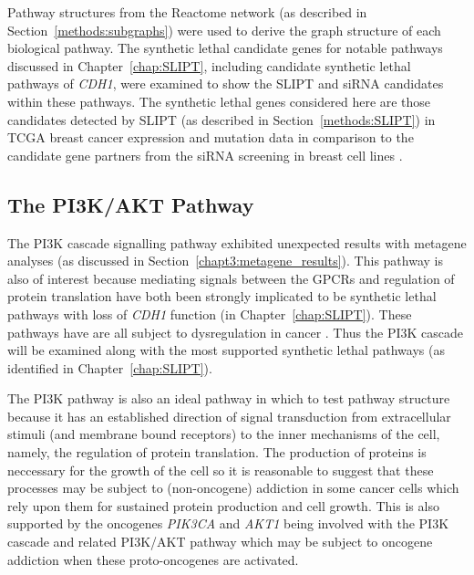 Pathway structures from the Reactome network (as described in Section~\ref{methods:subgraphs}) were used to derive the graph structure of each biological pathway. The synthetic lethal candidate genes for notable pathways discussed in Chapter~\ref{chap:SLIPT}, including candidate synthetic lethal pathways of \textit{CDH1}, were examined to show the \gls{SLIPT} and \gls{siRNA} candidates within these pathways. The synthetic lethal genes considered here are those candidates detected by \gls{SLIPT} (as described in Section~\ref{methods:SLIPT}) in \gls{TCGA} breast cancer expression and mutation data \citep{TCGA2012} in comparison to the candidate gene partners from the \gls{siRNA} screening in breast cell lines \citep{Telford2015}. 

\FloatBarrier

\subsection{The PI3K/AKT Pathway}  \label{chapt4:SL_Genes_PI3K}

\FloatBarrier

The \acrfull{PI3K} cascade signalling pathway exhibited unexpected results with metagene analyses (as discussed in Section~\ref{chapt3:metagene_results}). This pathway is also of interest because mediating signals between the \glspl{GPCR} and regulation of protein translation have both been strongly implicated to be synthetic lethal pathways with loss of \textit{CDH1} function (in Chapter~\ref{chap:SLIPT}). These pathways have are all subject to dysregulation in cancer \citep{Dorsam2007, Courtney2010, Gao2015}. Thus the PI3K cascade will be examined along with the most supported synthetic lethal pathways (as identified in Chapter~\ref{chap:SLIPT}).

The \gls{PI3K} pathway is also an ideal pathway in which to test pathway structure because it has an established direction of signal transduction from extracellular stimuli (and membrane bound receptors) to the inner mechanisms of the cell, namely, the regulation of protein translation. The production of proteins is neccessary for the growth of the cell so it is reasonable to suggest that these processes may be subject to (non-oncogene) addiction in some cancer cells which rely upon them for sustained protein production and cell growth. This is also supported by the oncogenes \textit{PIK3CA} and \textit{AKT1} being involved with the PI3K cascade and related PI3K/AKT pathway which may be subject to oncogene addiction when these proto-oncogenes are activated.

